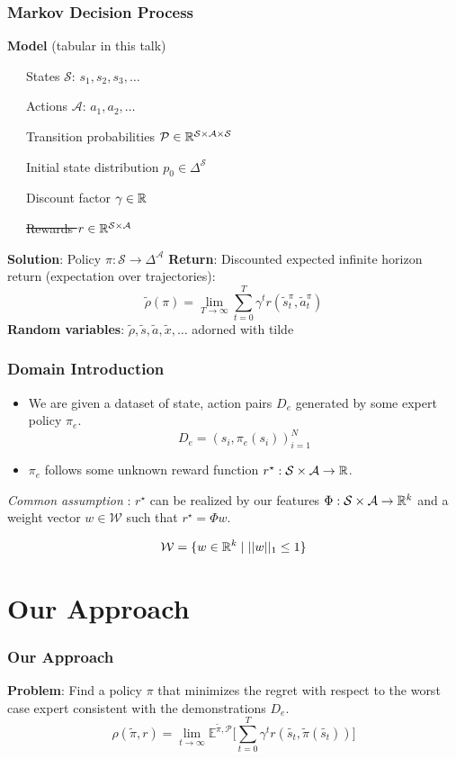 \documentclass{beamer}
\begin{document}
\begin{frame} \frametitle{Markov Decision Process}
  \textbf{Model} (tabular in this talk) \par
    {\small
   ~~~States $\mathcal{S}$: $s_1, s_2, s_3, \dots $ \par
   ~~~Actions $\mathcal{A}$: $a_1, a_2, \dots $ \par
   ~~~Transition probabilities $\mathcal{P} \in \mathbb{R}^{\mathcal{S} \times \mathcal{A} \times \mathcal{S} }$ \par
   ~~~Initial state distribution $p_0 \in \Delta^\mathcal{S}$ \par
   ~~~Discount factor $\gamma \in \mathbb{R}$ \par
   ~~~\sout{Rewards $r \in \mathbb{R}^{\mathcal{S} \times \mathcal{A}}$}}
    \vfill 
    \textbf{Solution}: Policy ${\pi}\colon \mathcal{S} \to \Delta^\mathcal{A}$
    \vfill
    \textbf{Return}: Discounted expected infinite horizon return (expectation over trajectories):
    \[
	    \tilde{\rho}(\pi) = \lim_{T \to \infty} \sum_{t=0}^T \gamma^t r(\tilde{s}^{\pi}_t, \tilde{a}^{{\pi}}_t)
    \]
    \vfill
    \textbf{Random variables}: $\tilde{\rho}, \tilde{s}, \tilde{a}, \tilde{x}, \dots $ adorned with tilde
\end{frame}

\begin{frame}
	\frametitle{Domain Introduction}
\begin{itemize}
	\item We are given a dataset of state, action pairs $D_e$ generated by some expert policy $\pi_e$. \[ D_e = (s_i, \pi_e(s_i))_{i=1}^N \]
	\item $\pi_e$ follows some unknown reward function $r^\star : \mathcal{S} \times \mathcal{A} \to \mathbb{R}$.
\end{itemize}
	\emph{Common assumption} : $r^\star$ can be realized by our features $\Phi : \mathcal{S} \times \mathcal{A} \to \mathbb{R}^k$
	and a weight vector $w \in \mathcal{W}$ such that $r^\star = \Phi w$.

	\[ \mathcal{W} = \lbrace w \in \mathbb{R}^k \mid \lvert \lvert w \rvert \rvert_1 \leq 1 \rbrace \]
\end{frame}

\section*{Our Approach}

\begin{frame}
	\frametitle{Our Approach}
	\textbf{Problem}: Find a policy $\pi$ that minimizes the regret with respect to the worst case expert consistent with the demonstrations $D_e$.
	\[ \rho(\tilde{\pi}, r) = \lim_{t \to \infty} \mathbb{E}^{\tilde{\pi}, \mathcal{P}} \lbrack \sum_{t=0}^T \gamma^t r(\tilde{s_t}, \tilde{\pi}(\tilde{s_t})) \rbrack \]
\end{frame}
\end{document}
